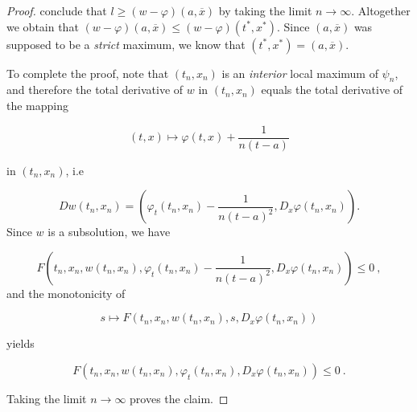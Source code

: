\begin{lemma}
\begin{proof}
				conclude that $ l \geq (w- \varphi)(a, \overline{x}) $ by taking the limit $ n \to \infty $. Altogether we obtain that $ (w - \varphi)(a, \overline{x}) \leq (w - \varphi)(t^{*}, x^{*}) $. Since $ (a, \overline{x}) $ was supposed to be a \emph{strict} maximum, we know that $ (t^{*}, x^{*}) = (a, \overline{x}) $.
				
				To complete the proof, note that $ (t_n, x_n) $ is an \emph{interior} local maximum of $ \psi_n $, and therefore the total derivative of $ w $ in $ (t_n, x_n) $ equals the total derivative of the mapping 
				
				\begin{equation*}
					(t, x) \mapsto \varphi(t, x) + \frac{1}{n(t-a)}
				\end{equation*}
				
				in $ (t_n, x_n) $, i.e
				
				\begin{equation*}
					Dw(t_n, x_n) = \left( \varphi_t(t_n, x_n) - \frac{1}{n(t-a)^2}, D_x \varphi(t_n, x_n) \right) .
				\end{equation*}
				Since $ w $ is a subsolution, we have
				
				\begin{equation*}
					F \left(t_n, x_n, w(t_n, x_n), \varphi_t(t_n, x_n) - \frac{1}{n(t-a)^2}, D_x \varphi(t_n, x_n) \right) \leq 0 \ ,
				\end{equation*}
				and the monotonicity of
				
				\begin{equation*}
					s \mapsto F( t_n, x_n, w(t_n, x_n), s, D_x \varphi(t_n, x_n ) )
				\end{equation*}
				
				yields 
				
				\begin{equation*}
					F(t_n, x_n, w(t_n, x_n), \varphi_t(t_n, x_n), D_x \varphi(t_n, x_n) ) \leq 0 \ .
				\end{equation*}
				
				Taking the limit $ n \to \infty $  proves the claim.
			\end{proof}
		\end{lemma}